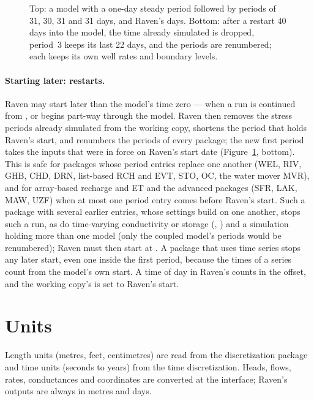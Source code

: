 \begin{figure}[!htbp]\centering
\caption{Top: a model with a one-day steady period followed by periods of 31, 30, 31 and 31 days, and Raven's days. Bottom: after a restart 40 days into the model, the time already simulated is dropped, period~3 keeps its last 22 days, and the periods are renumbered; each keeps its own well rates and boundary levels.}\label{fig:periods}
\end{figure}

\paragraph{Starting later: restarts.} Raven may start later than the model's time zero --- when a run is continued from
, or begins part-way through the model. Raven then removes the stress periods already simulated from the
working copy, shortens the period that holds Raven's start, and renumbers the periods of every package; the new first period
takes the inputs that were in force on Raven's start date (Figure~\ref{fig:periods}, bottom). This is safe for packages whose period
entries replace one another (WEL, RIV, GHB, CHD, DRN, list-based RCH and EVT, STO, OC, the water mover MVR), and for
array-based recharge and ET and the advanced packages (SFR, LAK, MAW, UZF) when at most one period entry comes before Raven's
start. Such a package with several earlier entries, whose settings build on one another, stops such a run, as do time-varying conductivity or storage
(, ) and a simulation holding more than one model (only the coupled model's periods would be
renumbered); Raven must then start at . A package that uses time series stops any later start, even one
inside the first period, because the times of a series count from the model's own start. A time of day in Raven's
 counts in the offset, and the working copy's  is set to Raven's start.

\section{Units}
Length units (metres, feet, centimetres) are read from the discretization package and time units (seconds to years) from
the time discretization. Heads, flows, rates, conductances and coordinates are converted at the interface; Raven's outputs
are always in metres and days.

